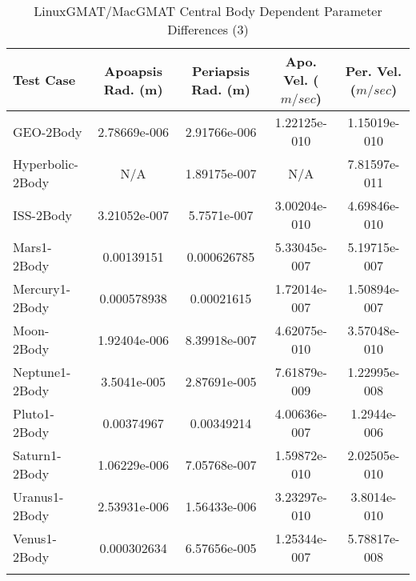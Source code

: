 \begin{table}[htbp!]
\centering
\caption{ LinuxGMAT/MacGMAT Central Body Dependent Parameter Differences (3)}
      \begin{tabular}{lcccc}
      \hline\hline
          Test Case & Apoapsis Rad. (m) & Periapsis Rad. (m) & Apo. Vel. ($m/sec$) & Per. Vel. ($m/sec$) \\
         \hline
         GEO-2Body & 2.78669e-006 & 2.91766e-006 & 1.22125e-010 & 1.15019e-010 \\
         Hyperbolic-2Body & N/A & 1.89175e-007 & N/A & 7.81597e-011 \\
         ISS-2Body & 3.21052e-007 & 5.7571e-007 & 3.00204e-010 & 4.69846e-010 \\
         Mars1-2Body & 0.00139151 & 0.000626785 & 5.33045e-007 & 5.19715e-007 \\
         Mercury1-2Body & 0.000578938 & 0.00021615 & 1.72014e-007 & 1.50894e-007 \\
         Moon-2Body & 1.92404e-006 & 8.39918e-007 & 4.62075e-010 & 3.57048e-010 \\
         Neptune1-2Body & 3.5041e-005 & 2.87691e-005 & 7.61879e-009 & 1.22995e-008 \\
         Pluto1-2Body & 0.00374967 & 0.00349214 & 4.00636e-007 & 1.2944e-006 \\
         Saturn1-2Body & 1.06229e-006 & 7.05768e-007 & 1.59872e-010 & 2.02505e-010 \\
         Uranus1-2Body & 2.53931e-006 & 1.56433e-006 & 3.23297e-010 & 3.8014e-010 \\
         Venus1-2Body & 0.000302634 & 6.57656e-005 & 1.25344e-007 & 5.78817e-008 \\
      \hline\hline
      \label{Table: LinuxGMAT-MacGMAT CB Parameters Set 3} 
\end{tabular}
\end{table}
